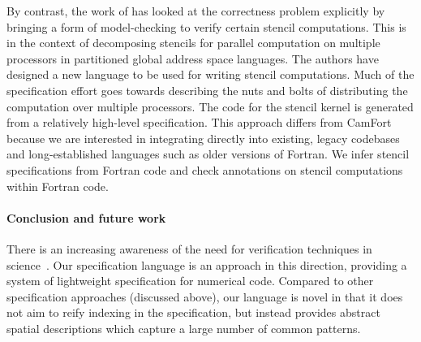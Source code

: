\documentclass[9pt,preprint]{sigplanconf}
\theoremstyle{definition}
\newcommand{\eg}{\emph{e.g.}}
\begin{document}
By contrast, the work of \citet{Abe:2013:IPDPSW} has looked at the
correctness problem explicitly by bringing a form of model-checking to
verify certain stencil computations. This is in the context of
decomposing stencils for parallel computation on multiple processors
 in partitioned global address
space languages. %
The authors have designed a new language to
be used for writing stencil computations. Much of the specification
effort goes towards describing the nuts and bolts of distributing the
computation over multiple processors. The code for the stencil kernel
is generated from a relatively high-level specification. This approach
differs from CamFort because we are interested in integrating directly
into existing, legacy codebases and long-established languages such as
older versions of Fortran. We infer stencil specifications from
Fortran code and check annotations on stencil computations within
Fortran code.


\paragraph{Conclusion and future work}

There is an increasing awareness
of the need for verification techniques in
science~\cite{post2005computational,oberkampf2010verification,orchard2014computational}.
Our specification language is an approach in this direction, providing
a system of lightweight specification for numerical code.
Compared to other specification approaches (discussed above), our language is novel in that it does
not aim to reify indexing in the specification, but instead
provides abstract spatial descriptions which capture a large number
of common patterns. %
\end{document}
